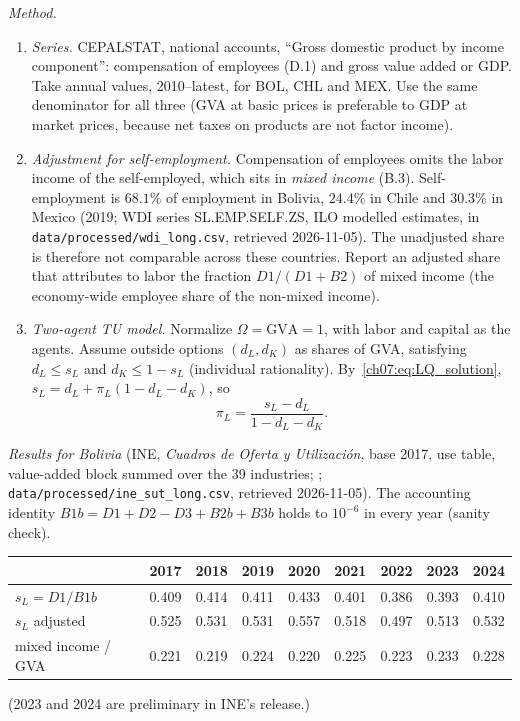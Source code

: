 \documentclass[../solutions_manual.tex]{subfiles}
\begin{document}
\emph{Method.}
\begin{enumerate}
\item \emph{Series.} CEPALSTAT, national accounts, ``Gross domestic product by income component'': compensation of employees (D.1) and gross value added or GDP. Take annual values, 2010--latest, for BOL, CHL and MEX. Use the same denominator for all three (GVA at basic prices is preferable to GDP at market prices, because net taxes on products are not factor income).
\item \emph{Adjustment for self-employment.} Compensation of employees omits the labor income of the self-employed, which sits in \emph{mixed income} (B.3). Self-employment is $68.1\%$ of employment in Bolivia, $24.4\%$ in Chile and $30.3\%$ in Mexico (2019; WDI series SL.EMP.SELF.ZS, ILO modelled estimates, in \nolinkurl{data/processed/wdi_long.csv}, retrieved 2026-11-05). The unadjusted share is therefore not comparable across these countries. Report an adjusted share that attributes to labor the fraction $D1/(D1 + B2)$ of mixed income (the economy-wide employee share of the non-mixed income).
\item \emph{Two-agent TU model.} Normalize $\Omega = \text{GVA} = 1$, with labor and capital as the agents. Assume outside options $(d_L, d_K)$ as shares of GVA, satisfying $d_L \le s_L$ and $d_K \le 1 - s_L$ (individual rationality). By~\eqref{ch07:eq:LQ_solution}, $s_L = d_L + \pi_L(1 - d_L - d_K)$, so
\[
\pi_L = \frac{s_L - d_L}{1 - d_L - d_K}.
\]
\end{enumerate}

\emph{Results for Bolivia} (INE, \textit{Cuadros de Oferta y Utilizaci\'on}, base 2017, use table, value-added block summed over the 39 industries; \citealp{ine2026sut}; \nolinkurl{data/processed/ine_sut_long.csv}, retrieved 2026-11-05). The accounting identity $B1b = D1 + D2 - D3 + B2b + B3b$ holds to $10^{-6}$ in every year (sanity check).
\begin{center}
\begin{tabular}{lcccccccc}
\toprule
& 2017 & 2018 & 2019 & 2020 & 2021 & 2022 & 2023 & 2024 \\
\midrule
$s_L = D1/B1b$ & 0.409 & 0.414 & 0.411 & 0.433 & 0.401 & 0.386 & 0.393 & 0.410 \\
$s_L$ adjusted & 0.525 & 0.531 & 0.531 & 0.557 & 0.518 & 0.497 & 0.513 & 0.532 \\
mixed income / GVA & 0.221 & 0.219 & 0.224 & 0.220 & 0.225 & 0.223 & 0.233 & 0.228 \\
\bottomrule
\end{tabular}
\end{center}
(2023 and 2024 are preliminary in INE's release.)
\end{document}
